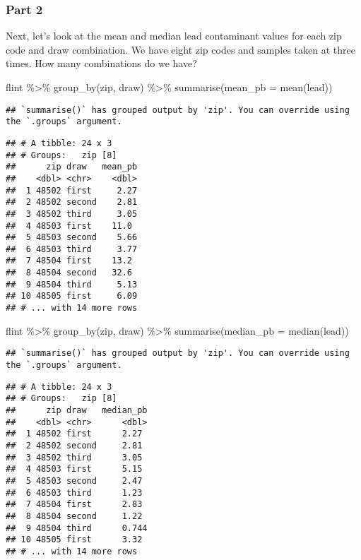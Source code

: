 \documentclass[
]{article}
\newenvironment{Shaded}{\begin{snugshade}}{\end{snugshade}}
\newcommand{\AttributeTok}[1]{\textcolor[rgb]{0.77,0.63,0.00}{#1}}
\newcommand{\FunctionTok}[1]{\textcolor[rgb]{0.00,0.00,0.00}{#1}}
\newcommand{\NormalTok}[1]{#1}
\newcommand{\SpecialCharTok}[1]{\textcolor[rgb]{0.00,0.00,0.00}{#1}}
\begin{document}
\hypertarget{part-2}{%
\subsubsection{Part 2}\label{part-2}}

Next, let's look at the mean and median lead contaminant values for each
zip code and draw combination. We have eight zip codes and samples taken
at three times. How many combinations do we have?

\begin{Shaded}
\begin{Highlighting}[]
\NormalTok{flint }\SpecialCharTok{\%\textgreater{}\%} 
  \FunctionTok{group\_by}\NormalTok{(zip, draw) }\SpecialCharTok{\%\textgreater{}\%} 
  \FunctionTok{summarise}\NormalTok{(}\AttributeTok{mean\_pb =} \FunctionTok{mean}\NormalTok{(lead))}
\end{Highlighting}
\end{Shaded}

\begin{verbatim}
## `summarise()` has grouped output by 'zip'. You can override using the `.groups` argument.
\end{verbatim}

\begin{verbatim}
## # A tibble: 24 x 3
## # Groups:   zip [8]
##      zip draw   mean_pb
##    <dbl> <chr>    <dbl>
##  1 48502 first     2.27
##  2 48502 second    2.81
##  3 48502 third     3.05
##  4 48503 first    11.0 
##  5 48503 second    5.66
##  6 48503 third     3.77
##  7 48504 first    13.2 
##  8 48504 second   32.6 
##  9 48504 third     5.13
## 10 48505 first     6.09
## # ... with 14 more rows
\end{verbatim}

\begin{Shaded}
\begin{Highlighting}[]
\NormalTok{flint }\SpecialCharTok{\%\textgreater{}\%} 
  \FunctionTok{group\_by}\NormalTok{(zip, draw) }\SpecialCharTok{\%\textgreater{}\%} 
  \FunctionTok{summarise}\NormalTok{(}\AttributeTok{median\_pb =} \FunctionTok{median}\NormalTok{(lead))}
\end{Highlighting}
\end{Shaded}

\begin{verbatim}
## `summarise()` has grouped output by 'zip'. You can override using the `.groups` argument.
\end{verbatim}

\begin{verbatim}
## # A tibble: 24 x 3
## # Groups:   zip [8]
##      zip draw   median_pb
##    <dbl> <chr>      <dbl>
##  1 48502 first      2.27 
##  2 48502 second     2.81 
##  3 48502 third      3.05 
##  4 48503 first      5.15 
##  5 48503 second     2.47 
##  6 48503 third      1.23 
##  7 48504 first      2.83 
##  8 48504 second     1.22 
##  9 48504 third      0.744
## 10 48505 first      3.32 
## # ... with 14 more rows
\end{verbatim}
\end{document}
